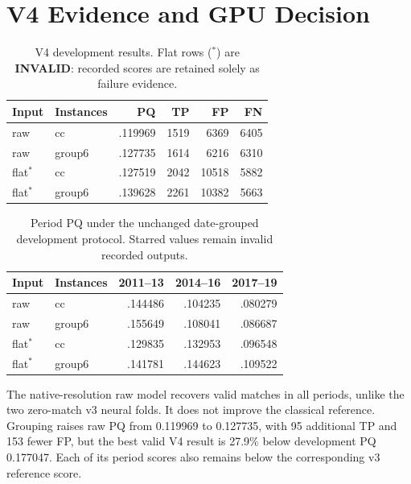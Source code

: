 \documentclass[sigconf]{acmart}
\begin{document}
\section{V4 Evidence and GPU Decision}
\begin{table}[t]
\caption{V4 development results. Flat rows ($^\ast$) are \textbf{INVALID}: recorded scores are retained solely as failure evidence.}
\label{tab:v4}
\centering
\small
\setlength{\tabcolsep}{3pt}
\begin{tabular}{llrrrr}
\toprule
Input & Instances & PQ & TP & FP & FN\\
\midrule
raw & cc & .119969 & 1519 & 6369 & 6405\\
raw & group6 & .127735 & 1614 & 6216 & 6310\\
flat$^\ast$ & cc & .127519 & 2042 & 10518 & 5882\\
flat$^\ast$ & group6 & .139628 & 2261 & 10382 & 5663\\
\bottomrule
\end{tabular}
\end{table}
\begin{table}[t]
\caption{Period PQ under the unchanged date-grouped development protocol. Starred values remain invalid recorded outputs.}
\label{tab:period}
\centering
\small
\setlength{\tabcolsep}{3pt}
\begin{tabular}{llrrr}
\toprule
Input & Instances & 2011--13 & 2014--16 & 2017--19\\
\midrule
raw & cc & .144486 & .104235 & .080279\\
raw & group6 & .155649 & .108041 & .086687\\
flat$^\ast$ & cc & .129835 & .132953 & .096548\\
flat$^\ast$ & group6 & .141781 & .144623 & .109522\\
\bottomrule
\end{tabular}
\end{table}
The native-resolution raw model recovers valid matches in all periods, unlike the two zero-match v3 neural folds. It does not improve the classical reference. Grouping raises raw PQ from 0.119969 to 0.127735, with 95 additional TP and 153 fewer FP, but the best valid V4 result is 27.9\% below development PQ 0.177047. Each of its period scores also remains below the corresponding v3 reference score.
\end{document}
